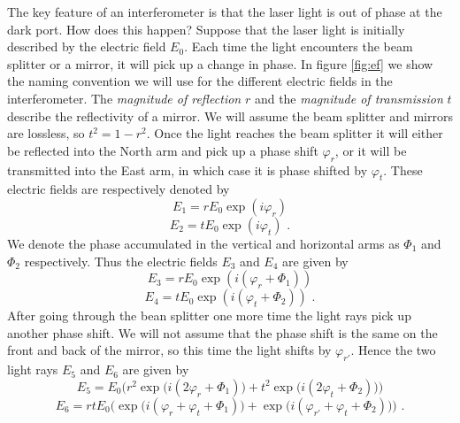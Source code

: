 \documentclass[11pt]{cuthesis}
\newcommand{\fs}{\text{ .}}
\begin{document}
The key feature of an interferometer is that the laser light is out of phase at the dark port. How does this happen? Suppose that the laser light is initially described by the electric field $E_0$. Each time the light encounters the beam splitter or a mirror, it will pick up a change in phase. In figure \ref{fig:ef} we show the naming convention we will use for the different electric fields in the interferometer. The \emph{magnitude of reflection} $r$ and the \emph{magnitude of transmission} $t$ describe the reflectivity of a mirror. We will assume the beam splitter and mirrors are lossless, so $t^2=1-r^2$. Once the light reaches the beam splitter it will either be reflected into the North arm and pick up a phase shift $\varphi_r$, or it will be transmitted into the East arm, in which case it is phase shifted by $\varphi_t$. These electric fields are respectively denoted by
\begin{equation} \label{E1}
E_1=r E_0  \exp(i \varphi_r)
\end{equation}
\begin{equation} \label{E2}
E_2=t E_0  \exp(i \varphi_t) \fs
\end{equation}
We denote the phase accumulated in the vertical and horizontal arms as $\Phi_1$ and $\Phi_2$ respectively. Thus the electric fields $E_3$ and $E_4$ are given by
\begin{equation}
E_3=r E_0  \exp(i( \varphi_r+\Phi_1))
\end{equation}
\begin{equation}
E_4=t E_0  \exp (i( \varphi_t+\Phi_2)) \fs
\end{equation}
After going through the bean splitter one more time the light rays pick up another phase shift. We will not assume that the phase shift is the same on the front and back of the mirror, so this time the light shifts by $\varphi_{r'}$. Hence the two light rays $E_5$ and $E_6$ are given by
\begin{equation}
E_5= E_0 \bigg(r^2 \exp \big( i ( 2\varphi_r+\Phi_1) \big)+t^2 \exp \big( i(2 \varphi_t+\Phi_2) \big) \bigg)
\end{equation}
\begin{equation} \label{E_6}
E_6=r t E_0 \bigg( \exp \big( i (\varphi_r+\varphi_t+\Phi_1) \big)+ \exp \big( i( \varphi_{r'}+\varphi_t+\Phi_2) \big) \bigg) \fs
\end{equation}
\end{document}
